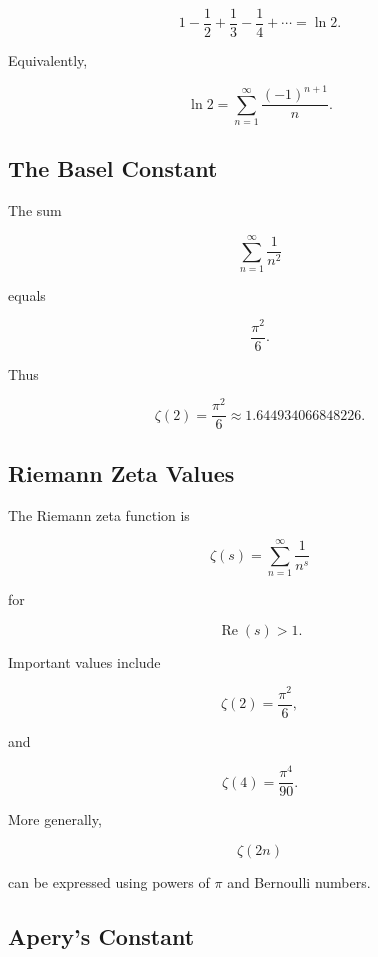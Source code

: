 \[
\boxed{
1
-
\frac12
+
\frac13
-
\frac14
+
\cdots
=
\ln2.
}
\]

Equivalently,

\[
\boxed{
\ln2
=
\sum_{n=1}^{\infty}
\frac{(-1)^{n+1}}{n}.
}
\]

\subsection{The Basel Constant}
\label{subsec:basel-constant-reference}

The sum

\[
\sum_{n=1}^{\infty}
\frac{1}{n^2}
\]

equals

\[
\boxed{
\frac{\pi^2}{6}.
}
\]

Thus

\[
\boxed{
\zeta(2)
=
\frac{\pi^2}{6}
\approx
1.644934066848226.
}
\]

\subsection{Riemann Zeta Values}
\label{subsec:zeta-values-reference}

The Riemann zeta function is

\[
\boxed{
\zeta(s)
=
\sum_{n=1}^{\infty}
\frac{1}{n^s}
}
\]

for

\[
\operatorname{Re}(s)>1.
\]

Important values include

\[
\boxed{
\zeta(2)
=
\frac{\pi^2}{6},
}
\]

and

\[
\boxed{
\zeta(4)
=
\frac{\pi^4}{90}.
}
\]

More generally,

\[
\zeta(2n)
\]

can be expressed using powers of \(\pi\) and Bernoulli numbers.

\subsection{Apery's Constant}
\label{subsec:apery-constant-reference}

